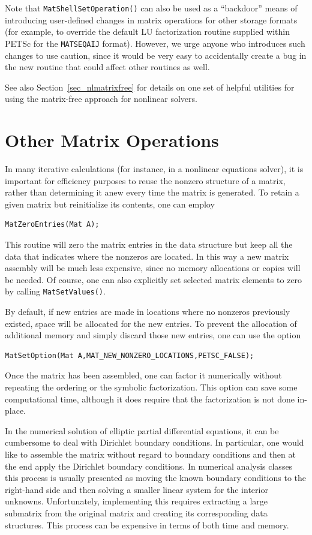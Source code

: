 Note that \lstinline{MatShellSetOperation()} can also be used as a
``backdoor'' means of introducing user-defined changes in matrix
operations for other storage formats (for example, to override the
default LU factorization routine supplied within PETSc for the
\lstinline{MATSEQAIJ} format).  However, we urge anyone who introduces such
changes to use caution, since it would be very easy to
accidentally create a bug in the new routine that could affect
other routines as well.

See also Section~\ref{sec_nlmatrixfree} for details on one set of
helpful utilities for using the matrix-free approach for nonlinear
solvers.

\section{Other Matrix Operations}
\label{sec_othermat}

In many iterative calculations (for instance, in a nonlinear equations
solver), it is important for efficiency purposes to reuse the nonzero
structure of a matrix, rather than determining it anew every time
the matrix is generated.  To retain a given matrix but reinitialize
its contents, one can employ
\begin{lstlisting}
MatZeroEntries(Mat A);
\end{lstlisting}
This routine will zero the matrix entries in the
data structure but keep all the data that indicates where the nonzeros
are located.  In this way a new matrix assembly will be much less
expensive, since no memory allocations or copies will be needed.
Of course, one can also explicitly set selected matrix elements to zero
by calling \lstinline{MatSetValues()}.

By default, if new entries are made in locations where no nonzeros
previously existed, space will be allocated for the new entries.
To prevent the allocation of additional memory and simply discard those
new entries, one can use the option
\begin{lstlisting}
MatSetOption(Mat A,MAT_NEW_NONZERO_LOCATIONS,PETSC_FALSE);
\end{lstlisting}
Once the matrix has been assembled, one can factor it numerically
without repeating the ordering or the symbolic factorization.
This option can save some computational time, although it
does require that the factorization is not done in-place.

In the numerical solution of elliptic partial differential equations,
it can be cumbersome to deal with Dirichlet boundary
 conditions. In
particular, one would like to assemble the matrix without regard to
boundary conditions and then at the end apply the Dirichlet boundary
conditions.
In numerical analysis classes this process is usually presented as moving the
known boundary conditions to the right-hand side and then solving a smaller
linear system for the interior unknowns. Unfortunately, implementing this
requires extracting a large submatrix from the original matrix and
creating its corresponding data structures. This process can be expensive
in terms of both time and memory.


